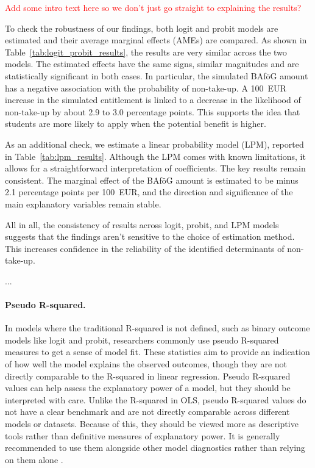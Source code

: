 \textcolor{red}{Add some intro text here so we don't just go straight to explaining the results?}

To check the robustness of our findings, both logit and probit models are estimated and their average marginal effects (AMEs) are compared. As shown in Table~\ref{tab:logit_probit_results}, the results are very similar across the two models. The estimated effects have the same signs, similar magnitudes and are statistically significant in both cases. In particular, the simulated BAföG amount has a negative association with the probability of non-take-up. A 100~EUR increase in the simulated entitlement is linked to a decrease in the likelihood of non-take-up by about 2.9 to 3.0 percentage points. This supports the idea that students are more likely to apply when the potential benefit is higher.

As an additional check, we estimate a linear probability model (LPM), reported in Table~\ref{tab:lpm_results}. Although the LPM comes with known limitations, it allows for a straightforward interpretation of coefficients. The key results remain consistent. The marginal effect of the BAföG amount is estimated to be minus 2.1 percentage points per 100~EUR, and the direction and significance of the main explanatory variables remain stable.

All in all, the consistency of results across logit, probit, and LPM models suggests that the findings aren't sensitive to the choice of estimation method. This increases confidence in the reliability of the identified determinants of non-take-up.

...

\paragraph{Pseudo R-squared.} In models where the traditional R-squared is not defined, such as binary outcome models like logit and probit, researchers commonly use pseudo R-squared measures to get a sense of model fit. These statistics aim to provide an indication of how well the model explains the observed outcomes, though they are not directly comparable to the R-squared in linear regression. Pseudo R-squared values can help assess the explanatory power of a model, but they should be interpreted with care. Unlike the R-squared in OLS, pseudo R-squared values do not have a clear benchmark and are not directly comparable across different models or datasets. Because of this, they should be viewed more as descriptive tools rather than definitive measures of explanatory power. It is generally recommended to use them alongside other model diagnostics rather than relying on them alone \citep{ozili_acceptable_2023}.

